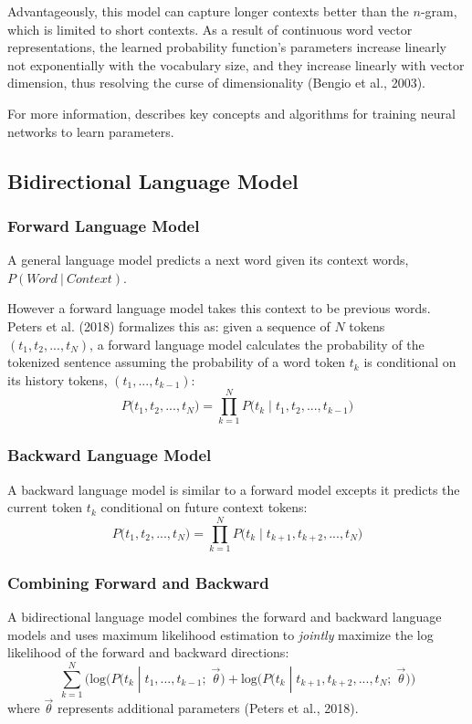 Advantageously, this model can capture longer contexts better than the $n$-gram, which is limited to short contexts. As a result of continuous word vector representations, the learned probability function's parameters increase linearly not exponentially with the vocabulary size, and they increase linearly with vector dimension, thus resolving the curse of dimensionality (Bengio et al., 2003).  

For more information,  describes key concepts and algorithms for training neural networks to learn parameters. 


\subsection{Bidirectional Language Model}

\subsubsection{Forward Language Model}

A general language model predicts a next word given its context words, $P(\textit{Word} \: | \: \textit{Context})$. 

However a forward language model takes this context to be previous words. Peters et al. (2018) formalizes this as:  given a sequence of $N$ tokens $(t_1, t_2, ..., t_N)$, a forward language model calculates the probability of the tokenized sentence assuming the probability of a word token $t_k$ is conditional on its history tokens, $(t_1, ..., t_{k-1})$:
$$
P \Big(t_1, t_2, ..., t_N \Big) = \prod_{k=1}^N P \Big(t_k \; | \; t_1, t_2, ..., t_{k-1} \Big)
$$

\subsubsection{Backward Language Model}

A backward language model is similar to a forward model excepts it predicts the current token $t_k$ conditional on future context tokens:
$$
P \Big(t_1, t_2, ..., t_N \Big) = \prod_{k=1}^N P \Big(t_k \; | \; t_{k+1}, t_{k+2}, ..., t_N \Big)
$$

\subsubsection{Combining Forward and Backward}

A bidirectional language model combines the forward and backward language models and uses maximum likelihood estimation to \emph{jointly} maximize the log likelihood of the forward and backward directions: 
$$
\sum_{k=1}^N \Big( \text{log} \Big( P \Big(t_k \; | \; t_1,...,t_{k-1}; \; \overrightarrow{\theta} \Big) + \text{log} \Big( P \Big(t_k \; | \; t_{k+1}, t_{k+2}, ..., t_N; \; \overrightarrow{\theta} \Big) \Big)
$$
where $\overrightarrow{\theta}$ represents additional parameters (Peters et al., 2018). 



